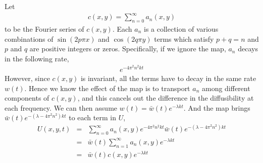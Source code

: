 Let
\begin{eqnarray*}
c(x,y) = \sum_{n=0}^{\infty} a_n(x,y) 
\end{eqnarray*}
to be the Fourier series of $c(x,y)$. Each $a_n$ is a collection of various combinations of $\sin{(2 p \pi x)}$ and $\cos{(2 q \pi y)}$ terms which satisfy $p+q=n$ and $p$ and $q$ are positive integers or zeros. Specifically, if we ignore the map, $a_n$ decays in the following rate, 
\begin{eqnarray*}
 e^{-4\pi^2 n^2 k t}
\end{eqnarray*}
However, since $c(x,y)$ is invariant, all the terms have to decay in the same rate $w(t)$. Hence we know the effect of the map is to transport $a_n$ among different components of $c(x,y)$, and this cancels out the difference in the diffusibility at each frequency. We can then assume $w(t) = \bar{w}(t) e^{-\lambda kt}$. And the map brings $\bar{w}(t) e^{-(\lambda-4 \pi^2 n^2) kt}$ to each term in $U$,
\begin{eqnarray*}
 U(x,y,t) &=&  \sum_{n=0}^{\infty} a_n(x,y) e^{-4\pi^2 n^2 k t} \bar{w}(t) e^{-(\lambda-4 \pi^2 n^2) kt}\\
          &=&  \bar{w}(t) \sum_{n=1}^{\infty} a_n(x,y) e^{-\lambda kt}\\
          &=&  \bar{w}(t) c(x,y) e^{-\lambda kt}
\end{eqnarray*}

